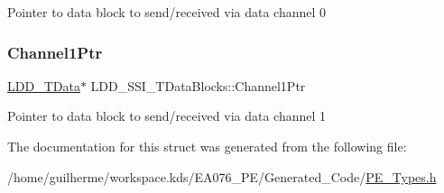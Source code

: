 Pointer to data block to send/received via data channel 0 \mbox{\label{struct_l_d_d___s_s_i___t_data_blocks_a5c0e65fe82f88a245123217769316fef}} 
\subsubsection{\texorpdfstring{Channel1\+Ptr}{Channel1Ptr}}
{\footnotesize\ttfamily \hyperlink{group___p_e___types__module_gade8ef9401405bd941b6da738b807f980}{L\+D\+D\+\_\+\+T\+Data}$\ast$ L\+D\+D\+\_\+\+S\+S\+I\+\_\+\+T\+Data\+Blocks\+::\+Channel1\+Ptr}

Pointer to data block to send/received via data channel 1 

The documentation for this struct was generated from the following file\+:\begin{DoxyCompactItemize}
\item 
/home/guilherme/workspace.\+kds/\+E\+A076\+\_\+\+P\+E/\+Generated\+\_\+\+Code/\hyperlink{_p_e___types_8h}{P\+E\+\_\+\+Types.\+h}\end{DoxyCompactItemize}
